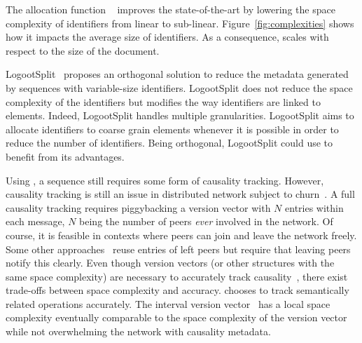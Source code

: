 The allocation function \NAME{}~\cite{nedelec2013lseq,nedelec2013concurrency}
improves the state-of-the-art by lowering the space complexity of identifiers
from linear to sub-linear. Figure~\ref{fig:complexities} shows how it impacts
the average size of identifiers. As a consequence, \NAME{} scales with respect
to the size of the document.

LogootSplit~\cite{andre2013supporting} proposes an orthogonal solution to
reduce the metadata generated by sequences with variable-size
identifiers. LogootSplit does not reduce the space complexity of the
identifiers but modifies the way identifiers are linked to elements. Indeed,
LogootSplit handles multiple granularities. LogootSplit aims to allocate
identifiers to coarse grain elements whenever it is possible in order to reduce
the number of identifiers. Being orthogonal, LogootSplit could use \NAME{} to
benefit from its advantages.

Using \NAME{}, a sequence still requires some form of causality
tracking. However, causality tracking is still an issue in distributed network
subject to churn~\cite{baldoni2002fundamentals}. A full causality tracking
requires piggybacking a version vector with $N$ entries within each message,
$N$ being the number of peers \emph{ever} involved in the network. Of course,
it is feasible in contexts where peers can join and leave the network
freely. Some other approaches~\cite{almeida2008interval} reuse entries of left
peers but require that leaving peers notify this clearly. Even though version
vectors (or other structures with the same space complexity) are necessary to
accurately track causality~\cite{charronbost1991concerning}, there exist
trade-offs between space complexity and accuracy. \EDITORNAME{} chooses to
track semantically related operations accurately. The interval version
vector~\cite{mukund2014optimized} has a local space complexity eventually
comparable to the space complexity of the version vector while not overwhelming
the network with causality metadata.


